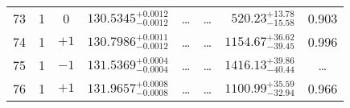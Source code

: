 \begin{table*}[!]
\begin{tabular}{llcrrlrc}
73 & 1 & 0 & $    130.5345_{-      0.0012}^{+      0.0012}$ & \multicolumn{1}{c}{\dots} & \multicolumn{1}{c}{\dots} & $      520.23_{-       15.58}^{+       13.78}$ & 0.903\\[1pt]
74 & 1 & $+1$ & $    130.7986_{-      0.0012}^{+      0.0011}$ & \multicolumn{1}{c}{\dots} & \multicolumn{1}{c}{\dots} & $     1154.67_{-       39.45}^{+       36.62}$ & 0.996\\[1pt]
75 & 1 & $-1$ & $    131.5369_{-      0.0004}^{+      0.0004}$ & \multicolumn{1}{c}{\dots} & \multicolumn{1}{c}{\dots} & $     1416.13_{-       40.44}^{+       39.86}$ & \dots \\[1pt]
76 & 1 & $+1$ & $    131.9657_{-      0.0008}^{+      0.0008}$ & \multicolumn{1}{c}{\dots} & \multicolumn{1}{c}{\dots} & $     1100.99_{-       32.94}^{+       35.59}$ & 0.966\\[1pt]


\end{tabular}
\end{table*}
